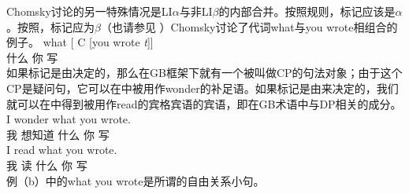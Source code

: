 Chomsky讨论的另一特殊情况是LI$\alpha$与非LI$\beta$的内部合并。按照规则，标记应该是$\alpha$。按照，标记应为$\beta$（也请参见 ）Chomsky讨论了代词what与you wrote相组合的例子。
\ea
\label{ex-what-you-wrote}
\gll what [ C [you wrote \emph{t}]]\\
什么 \spacebr{} {} \spacebr{}你 写 \\
\z
如果标记是由决定的，那么在GB框架下就有一个被叫做CP的句法对象；由于这个CP是疑问句，它可以在中被用作wonder的补足语。如果标记是由来决定的，我们就可以在中得到被用作read的宾格宾语的宾语，即在GB术语中与DP相关的成分。
\eal
\ex 
\gll I wonder what you wrote.\\
我 想知道 什么 你 写\\
\ex\label{ex-i-read-what-you-wrote} 
\gll I read what you wrote.\\
我 读 什么 你 写\\
\zl
例（b）中的what you wrote是所谓的自由关系小句。



